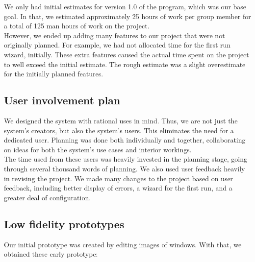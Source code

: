 \documentclass[12pt,a4paper]{article}
\begin{document}
We only had initial estimates for version 1.0 of the program, which was our base goal. In that, we estimated approximately 25 hours of work per group member for a total of 125 man hours of work on the project. \\

However, we ended up adding many features to our project that were not originally planned. For example, we had not allocated time for the first run wizard, initially. These extra features caused the actual time spent on the project to well exceed the initial estimate. The rough estimate was a slight overestimate for the initially planned features.

\subsection{User involvement plan}
We designed the system with rational uses in mind. Thus, we are not just the system's creators, but also the system's users. This eliminates the need for a dedicated user. Planning was done both individually and together, collaborating on ideas for both the system's use cases and interior workings. \\

The time used from these users was heavily invested in the planning stage, going through several thousand words of planning. We also used user feedback heavily in revising the project. We made many changes to the project based on user feedback, including better display of errors, a wizard for the first run, and a greater deal of configuration.

\subsection{Low fidelity prototypes}
Our initial prototype was created by editing images of windows. With that, we obtained these early prototype: \\

 \\
\end{document}
